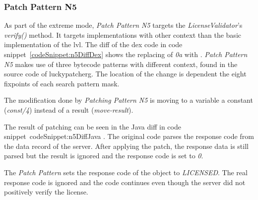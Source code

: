 \subsubsection{Patch Pattern N5}
As part of the extreme mode, \textit{Patch Pattern N5} targets the \textit{LicenseValidator}'s \textit{verify()} method.
It targets implementations with other context than the basic implementation of the \gls{lvl}.
\newline
The diff of the dex code in code snippet~\ref{codeSnippet:n5DiffDex} shows the replacing of \textit{0a} with .
\textit{Patch Pattern N5} makes use of three bytecode patterns with different context, found in the source code of \gls{luckypatcherg}.
The location of the change is dependent the eight fixpoints of each search pattern mask.
\newline

The modification done by \textit{Patching Pattern N5} is moving to a variable a constant (\textit{const/4}) instead of a result (\textit{move-result}).
\newline

The result of patching can be seen in the Java diff in code snippet~{codeSnippet:n5DiffJava} .
The original code parses the response code from the data record of the server.
After applying the patch, the response data is still parsed but the result is ignored and the response code is set to \textit{0}.
\newline

The \textit{Patch Pattern} sets the response code of the object to \textit{LICENSED}.
The real response code is ignored and the code continues even though the server did not positively verify the license.

